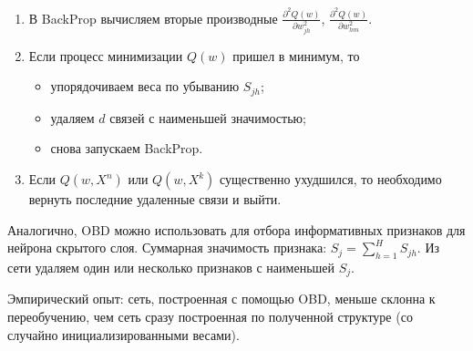 \documentclass[specialist, 12pt, 
subf, %
href, colorlinks=true,
substylefile = spbu.rtx,
]{disser}
\begin{document}
\begin{enumerate}
\item В BackProp вычисляем вторые производные $\frac{\partial^2 Q(w) }{\partial w_{jh}^2 } $,  $\frac{\partial^2 Q(w) }{\partial w_{hm}^2 } $.
\item Если процесс минимизации $Q(w)$ пришел в минимум, то
\begin{itemize}
\item упорядочиваем веса по убыванию $S_{jh}$;
\item удаляем $d$ связей с наименьшей значимостью;
\item снова запускаем BackProp.
\end{itemize}
\item Если $Q(w, X^n)$ или $Q(w, X^k)$ существенно ухудшился, то необходимо вернуть последние удаленные связи и выйти.
\end{enumerate}

Аналогично, OBD можно использовать для отбора информативных признаков для нейрона скрытого слоя.
Суммарная значимость признака: $S_j = \sum_{h=1}^{H} S_{jh}$. Из сети удаляем один или несколько признаков с наименьшей $S_j$.

Эмпирический опыт: сеть, построенная с помощью OBD, меньше склонна к переобучению, чем сеть сразу построенная по полученной структуре (со случайно инициализированными весами).
\end{document}
